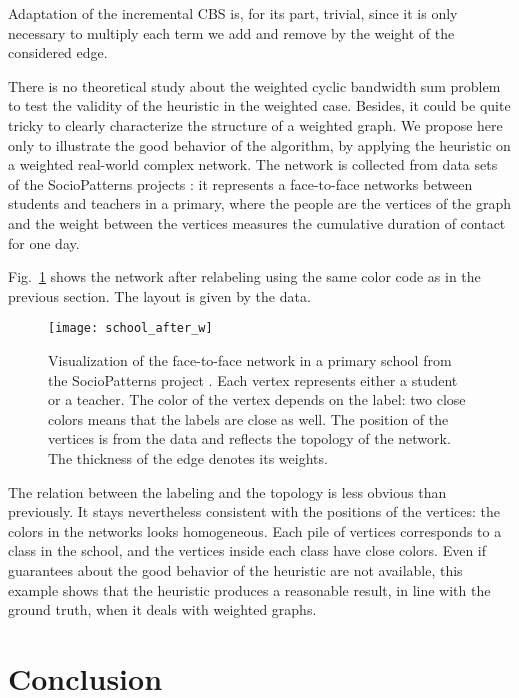 \documentclass{scrartcl}
\theoremstyle{plain}
\newcommand{\cbs}{CBS}
\begin{document}
Adaptation of the incremental \cbs{} is, for its part, trivial, since it is only 
necessary to multiply each term we add and remove by the weight of the 
considered edge. 

There is no theoretical study about the weighted cyclic bandwidth sum problem to 
test the validity of the heuristic in the weighted case. Besides, it could be 
quite tricky to clearly characterize the structure of a weighted graph. We 
propose here only to illustrate the good behavior of the algorithm, by applying 
the heuristic on a weighted real-world complex network. The network is collected 
from data sets of the SocioPatterns projects \cite{Fournet2014}: it represents 
a face-to-face 
networks between students and teachers in a primary, where the people are the 
vertices of the graph and the weight between the vertices measures the 
cumulative duration of contact for one day.

Fig.~\ref{fig:school} shows the network after relabeling using the same color 
code as in the previous section. The layout is given by the data.

\begin{figure}[htp]
  \centering
	\texttt{[image: school\_after\_w]}

\caption{\label{fig:school}Visualization of the face-to-face network in a 
primary school from the SocioPatterns project \cite{Fournet2014}. Each vertex 
represents either a student or a teacher. The color of the vertex depends on the 
label: two close colors means that the labels are close as well. The position 
of the vertices is from the data and reflects the topology of the network. The 
thickness of the edge denotes its weights.}
\end{figure}

The relation between the labeling and the topology is less obvious than 
previously. It stays nevertheless consistent with the positions of the vertices: 
the colors in the networks looks homogeneous. Each pile of vertices corresponds 
to a class in the school, and the vertices inside each class have close colors. 
Even if guarantees about the good behavior of the heuristic are not available, 
this example shows that the heuristic produces a reasonable result, in line with 
the ground truth, when it deals with weighted graphs.


 



\makeatletter{}\section{Conclusion}
\label{sec:conclusion}
\end{document}
